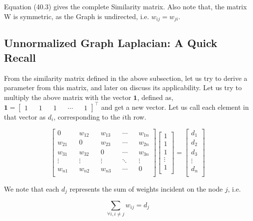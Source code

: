 \documentclass[english]{article}
\theoremstyle{plain}
\begin{document}
Equation (40.3) gives the complete Similarity matrix. Also note that, the matrix W is symmetric, as the Graph is undirected, i.e. $w_{ij} = w_{ji}$.

\subsection{Unnormalized Graph Laplacian: A Quick Recall}
From the similarity matrix defined in the above subsection, let us try to derive a parameter from this matrix, and later on discuss its applicability. Let us try to multiply the above matrix with the vector $\boldsymbol{1}$, defined as,
$\boldsymbol{1} =
\begin{bmatrix}
1 && 1 && 1 && \cdots && 1
\end{bmatrix}^{\top}$ and get a new vector. Let us call each element in that vector as $d_{i}$, corresponding to the $i$th row.  

\begin{equation}
\begin{bmatrix}
0 && w_{12} && w_{13} && \cdots && w_{1n} \\
w_{21} && 0 && w_{23} && \cdots && w_{2n} \\
w_{31} && w_{32} && 0 && \cdots && w_{3n} \\
\vdots && \vdots && \vdots && \ddots && \vdots \\
w_{n1} && w_{n2} && w_{n3} && \cdots && 0 \\
\end{bmatrix}
\begin{bmatrix}
1 \\
1 \\
1 \\
\vdots \\
1 \\
\end{bmatrix}
= 
\begin{bmatrix}
d_{1} \\
d_{2} \\
d_{3} \\
\vdots \\
d_{n} \\
\end{bmatrix}
\end{equation}

We note that each $d_{j}$ represents the sum of weights incident on the node $j$, i.e.

\begin{equation}
\sum_{\forall i, i\neq j} w_{ij} = d_{j}
\end{equation}
\end{document}

